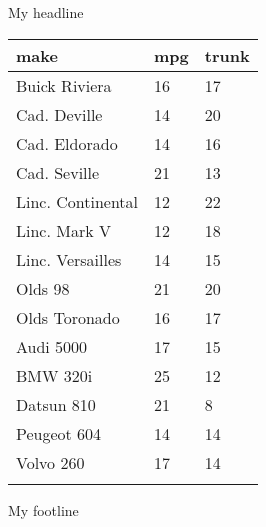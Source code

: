 \documentclass{article}
\begin{document}
\begin{center}
My headline
\end{center}
\begin{table}[h] \centering%
\begin{tabularx}{\textwidth}{lCC}
\toprule
make&mpg&trunk \tabularnewline
\midrule\addlinespace[1.5ex]
Buick Riviera&16&17 \tabularnewline
Cad. Deville&14&20 \tabularnewline
Cad. Eldorado&14&16 \tabularnewline
Cad. Seville&21&13 \tabularnewline
Linc. Continental&12&22 \tabularnewline
Linc. Mark V&12&18 \tabularnewline
Linc. Versailles&14&15 \tabularnewline
Olds 98&21&20 \tabularnewline
Olds Toronado&16&17 \tabularnewline
Audi 5000&17&15 \tabularnewline
BMW 320i&25&12 \tabularnewline
Datsun 810&21&8 \tabularnewline
Peugeot 604&14&14 \tabularnewline
Volvo 260&17&14 \tabularnewline
\bottomrule \addlinespace[1.5ex]
\end{tabularx}%
\end{table}%
My footline
\end{document}
